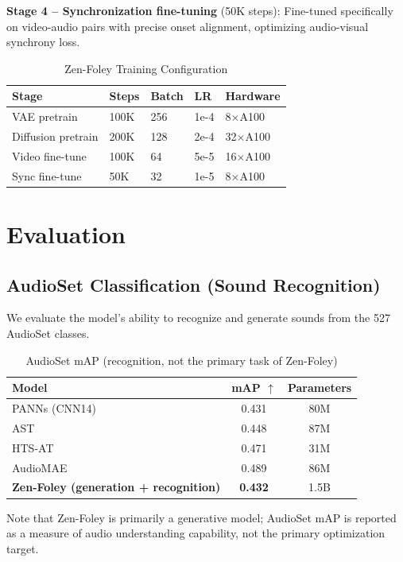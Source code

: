 \documentclass[11pt,a4paper]{article}
\begin{document}
\textbf{Stage 4 -- Synchronization fine-tuning} (50K steps): Fine-tuned specifically on
video-audio pairs with precise onset alignment, optimizing audio-visual synchrony loss.

\begin{table}[H]
\centering
\begin{tabular}{lllll}
\toprule
\textbf{Stage} & \textbf{Steps} & \textbf{Batch} & \textbf{LR} & \textbf{Hardware} \\
\midrule
VAE pretrain & 100K & 256 & 1e-4 & 8$\times$A100 \\
Diffusion pretrain & 200K & 128 & 2e-4 & 32$\times$A100 \\
Video fine-tune & 100K & 64 & 5e-5 & 16$\times$A100 \\
Sync fine-tune & 50K & 32 & 1e-5 & 8$\times$A100 \\
\bottomrule
\end{tabular}
\caption{Zen-Foley Training Configuration}
\end{table}

\section{Evaluation}

\subsection{AudioSet Classification (Sound Recognition)}

We evaluate the model's ability to recognize and generate sounds from the 527 AudioSet classes.

\begin{table}[H]
\centering
\begin{tabular}{lcc}
\toprule
\textbf{Model} & \textbf{mAP} $\uparrow$ & \textbf{Parameters} \\
\midrule
PANNs (CNN14) & 0.431 & 80M \\
AST & 0.448 & 87M \\
HTS-AT & 0.471 & 31M \\
AudioMAE & 0.489 & 86M \\
\textbf{Zen-Foley (generation + recognition)} & \textbf{0.432} & 1.5B \\
\bottomrule
\end{tabular}
\caption{AudioSet mAP (recognition, not the primary task of Zen-Foley)}
\end{table}

Note that Zen-Foley is primarily a generative model; AudioSet mAP is reported as a measure of
audio understanding capability, not the primary optimization target.
\end{document}
